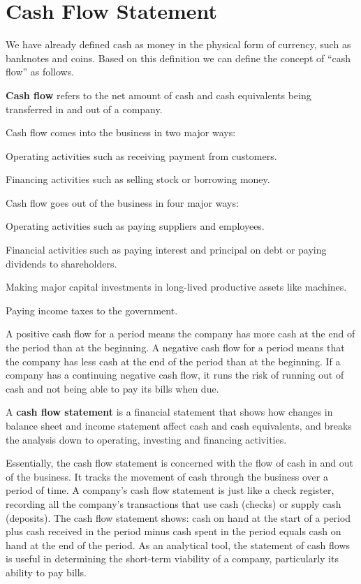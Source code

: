\section{Cash Flow Statement}

We have already defined cash as money in the physical form of currency, such as banknotes and coins. Based on
this definition we can define the concept of ``cash flow'' as follows.

\textbf{Cash flow} refers to the net amount of cash and cash equivalents being transferred in and out of a company.
\ed

Cash flow comes into the business in two major ways:
\bit
\item Operating activities such as receiving payment from customers.
\item Financing activities such as selling stock or borrowing money.
\eit

Cash flow goes out of the business in four major ways:
\bit
\item Operating activities such as paying suppliers and employees.
\item Financial activities such as paying interest and principal on debt or paying dividends to shareholders.
\item Making major capital investments in long-lived productive assets like machines.
\item Paying income taxes to the government.
\eit

A positive cash flow for a period means the company has more cash at the end of the period than at the beginning. A
negative cash flow for a period means that the company has less cash at the end of the period than at the beginning.
If a company has a continuing negative cash flow, it runs the risk of running out of cash and not being able to pay
its bills when due.

A \textbf{cash flow statement} is a financial statement that shows how changes in balance sheet and income statement
affect cash and cash equivalents, and breaks the analysis down to operating, investing and financing activities.
\ed

Essentially, the cash flow statement is concerned with the flow of cash in and out of the business. It tracks the
movement of cash through the business over a period of time. A company's cash flow statement is just like a check
register, recording all the company's transactions that use cash (checks) or supply cash (deposits). The cash flow
statement shows: cash on hand at the start of a period plus cash received in the period minus cash spent in the
period equals cash on hand at the end of the period. As an analytical tool, the statement of cash flows is useful in
determining the short-term viability of a company, particularly its ability to pay bills.

